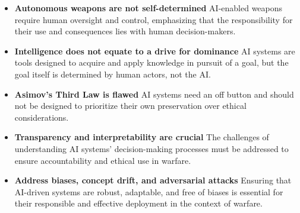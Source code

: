 \begin{itemize}
\item \textbf{Autonomous weapons are not self-determined} AI-enabled weapons require human oversight and control, emphasizing that the responsibility for their use and consequences lies with human decision-makers.
\item \textbf{Intelligence does not equate to a drive for dominance} AI systems are tools designed to acquire and apply knowledge in pursuit of a goal, but the goal itself is determined by human actors, not the AI.
\item \textbf{Asimov's Third Law is flawed} AI systems need an off button and should not be designed to prioritize their own preservation over ethical considerations.
\item \textbf{Transparency and interpretability are crucial} The challenges of understanding AI systems' decision-making processes must be addressed to ensure accountability and ethical use in warfare.
\item \textbf{Address biases, concept drift, and adversarial attacks} Ensuring that AI-driven systems are robust, adaptable, and free of biases is essential for their responsible and effective deployment in the context of warfare.
\end{itemize}
